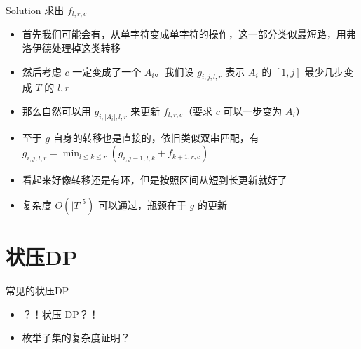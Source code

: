 ﻿\documentclass[aspectratio=169]{ctexbeamer}
\begin{document}
\begin{frame}{Solution}
    求出 $f_{l,r,c}$
    \begin{itemize}
        \item 首先我们可能会有，从单字符变成单字符的操作，这一部分类似最短路，用弗洛伊德处理掉这类转移
        \item 然后考虑 $c$ 一定变成了一个 $A_i$。我们设 $g_{i,j,l,r}$ 表示 $A_i$ 的 $[1,j]$ 最少几步变成 $T$ 的 ${l,r}$
        \item 那么自然可以用 $g_{i,|A_i|,l,r}$ 来更新 $f_{l,r,c}$（要求 $c$ 可以一步变为 $A_i$）
        \item 至于 $g$ 自身的转移也是直接的，依旧类似双串匹配，有 $g_{i,j,l,r}=\min_{l\le k\le r}(g_{i,j-1,l,k}+f_{k+1,r,c})$
        \item 看起来好像转移还是有环，但是按照区间从短到长更新就好了
        \item 复杂度 $O(|T|^5)$ 可以通过，瓶颈在于 $g$ 的更新
    \end{itemize}
\end{frame}





    
    












\section{状压DP}

\begin{frame}{常见的状压DP}
    \begin{itemize}
        \item ？！状压 DP？！
        \item 枚举子集的复杂度证明？
    \end{itemize}
\end{frame}
\end{document}
